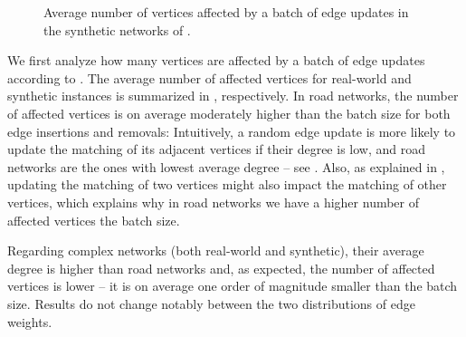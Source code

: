 \begin{figure}[t]
\caption{Average number of vertices affected by a batch of edge updates in the
synthetic networks of .}
\label{fig:dyn-mwm:affected-synthetic}
\end{figure}

We first analyze how many vertices are affected by a batch of edge updates according
to .
The average number of affected vertices for real-world and synthetic instances
is summarized in ,
respectively.
In road networks, the number of affected vertices
is on average moderately higher than the batch size for both edge insertions
and removals: Intuitively, a random edge update is
more likely to update the matching of its adjacent vertices if their degree is
low, and road networks are the ones with lowest average degree -- see
. Also, as
explained in , updating the matching of
two vertices might also impact the matching of other vertices, which explains why in road networks
we have a higher number of affected vertices \wrt the batch size.

Regarding complex networks (both real-world and synthetic), their average
degree is higher than road networks and, as expected, the number of affected
vertices is lower -- it is on average one order of magnitude smaller than the
batch size. Results do not change notably between the two distributions of edge
weights.


